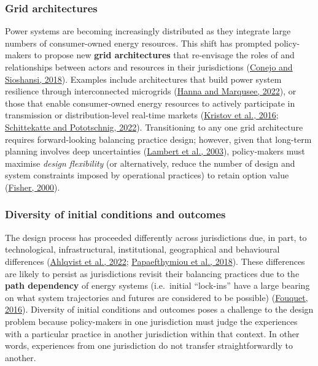 \documentclass[12pt,a4paper,]{report}
\begin{document}
\hypertarget{grid-architectures}{%
\subsubsection{Grid architectures}\label{grid-architectures}}

Power systems are becoming increasingly distributed as they integrate
large numbers of consumer-owned energy resources. This shift has
prompted policy-makers to propose new \textbf{grid architectures} that
re-envisage the roles of and relationships between actors and resources
in their jurisdictions
(\protect\hyperlink{ref-conejoRethinkingRestructuredElectricity2018}{Conejo
and Sioshansi, 2018}). Examples include architectures that build power
system resilience through interconnected microgrids
(\protect\hyperlink{ref-hannaDesigningResilientDecentralized2022}{Hanna
and Marqusee, 2022}), or those that enable consumer-owned energy
resources to actively participate in transmission or distribution-level
real-time markets
(\protect\hyperlink{ref-kristovTaleTwoVisions2016}{Kristov et al.,
2016};
\protect\hyperlink{ref-schittekatteDistributedEnergyResources2022}{Schittekatte
and Pototschnig, 2022}). Transitioning to any one grid architecture
requires forward-looking balancing practice design; however, given that
long-term planning involves deep uncertainties
(\protect\hyperlink{ref-lambertChallengeLongTermPolicy2003}{Lambert et
al., 2003}), policy-makers must maximise \emph{design flexibility} (or
alternatively, reduce the number of design and system constraints
imposed by operational practices) to retain option value
(\protect\hyperlink{ref-fisherInvestmentUncertaintyOption2000}{Fisher,
2000}).

\hypertarget{diversity-of-initial-conditions-and-outcomes}{%
\subsubsection{Diversity of initial conditions and
outcomes}\label{diversity-of-initial-conditions-and-outcomes}}

The design process has proceeded differently across jurisdictions due,
in part, to technological, infrastructural, institutional, geographical
and behavioural differences
(\protect\hyperlink{ref-ahlqvistSurveyComparingCentralized2022}{Ahlqvist
et al., 2022};
\protect\hyperlink{ref-papaefthymiouPowerSystemFlexibility2018}{Papaefthymiou
et al., 2018}). These differences are likely to persist as jurisdictions
revisit their balancing practices due to the \textbf{path dependency} of
energy systems (i.e.~initial ``lock-ins'' have a large bearing on what
system trajectories and futures are considered to be possible)
(\protect\hyperlink{ref-fouquetPathDependenceEnergy2016}{Fouquet,
2016}). Diversity of initial conditions and outcomes poses a challenge
to the design problem because policy-makers in one jurisdiction must
judge the experiences with a particular practice in another jurisdiction
within that context. In other words, experiences from one jurisdiction
do not transfer straightforwardly to another.
\end{document}
